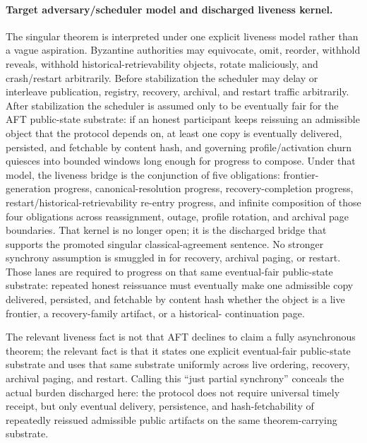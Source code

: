 \documentclass[11pt]{article}
\newcommand{\AFT}{\textsc{AFT}}
\begin{document}
\paragraph{Target adversary/scheduler model and discharged liveness kernel.}
The singular theorem is interpreted under one explicit liveness model rather
than a vague aspiration. Byzantine authorities may equivocate,
omit, reorder, withhold reveals, withhold historical-retrievability objects,
rotate maliciously, and crash/restart arbitrarily. Before stabilization the
scheduler may delay or interleave publication, registry, recovery, archival,
and restart traffic arbitrarily. After stabilization the scheduler is assumed
only to be eventually fair for the AFT public-state substrate: if an honest
participant keeps reissuing an admissible object that the protocol depends on,
at least one copy is eventually delivered, persisted, and fetchable by content
hash, and governing profile/activation churn quiesces into bounded windows
long enough for progress to compose. Under that model, the liveness bridge is
the conjunction of five obligations: frontier-generation progress,
canonical-resolution progress, recovery-completion progress,
restart/historical-retrievability re-entry progress, and infinite composition of
those four obligations across reassignment, outage, profile rotation, and
archival page boundaries. That kernel is no longer open; it is the discharged
bridge that supports the promoted singular classical-agreement sentence.
No stronger synchrony assumption is smuggled in for recovery, archival paging,
or restart. Those lanes are required to progress on that same eventual-fair
public-state substrate: repeated honest reissuance must eventually make one
admissible copy delivered, persisted, and fetchable by content hash whether
the object is a live frontier, a recovery-family artifact, or a historical-
continuation page.

The relevant liveness fact is not that \AFT{} declines to claim a fully
asynchronous theorem; the relevant fact is that it states one explicit
eventual-fair public-state substrate and uses that same substrate uniformly
across live ordering, recovery, archival paging, and restart. Calling this
``just partial synchrony'' conceals the actual burden discharged here: the
protocol does not require universal timely receipt, but only eventual delivery,
persistence, and hash-fetchability of repeatedly reissued admissible public
artifacts on the same theorem-carrying substrate.
\end{document}
